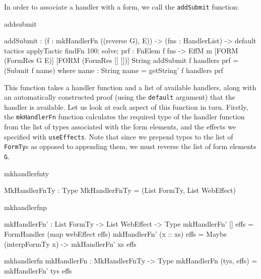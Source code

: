\noindent
In order to associate a handler with a form, we call the \texttt{addSubmit}
function:

\begin{SaveVerbatim}{addsubmit}

addSubmit : (f :  mkHandlerFn ((reverse G), E)) ->
            (fns : HandlerList) ->
            {default tactics 
              { applyTactic findFn 100; solve; }
              prf : FnElem f fns} ->
            EffM m [FORM (FormRes G E)]
                   [FORM (FormRes [] [])] 
                   String
addSubmit f handlers {prf} = (Submit f name)
    where name : String
          name = getString' f handlers prf          

\end{SaveVerbatim}

\noindent
This function takes a handler function and a list of available handlers, along with
an automatically constructed proof (using the \texttt{default} argument) that the
handler is available.
Let us look at each aspect of this function in turn. Firstly, the
\texttt{mkHandlerFn} function calculates the required type of the handler
function from the list of types associated with the form elements, and the
effects we specified with \texttt{useEffects}. Note that since we prepend types
to the list of \texttt{FormTy}s as opposed to appending them, we must reverse
the list of form elements \texttt{G}.

\begin{SaveVerbatim}{mkhandlerfnty}

MkHandlerFnTy : Type
MkHandlerFnTy = (List FormTy, List WebEffect)

\end{SaveVerbatim}

\begin{SaveVerbatim}{mkhandlerfnp}

mkHandlerFn' : List FormTy -> List WebEffect -> Type
mkHandlerFn' [] effs = FormHandler (map webEffect effs) 
mkHandlerFn' (x :: xs) effs = Maybe (interpFormTy x) -> 
                              mkHandlerFn' xs effs 
\end{SaveVerbatim}

\begin{SaveVerbatim}{mkhandlerfn}
mkHandlerFn : MkHandlerFnTy -> Type 
mkHandlerFn (tys, effs) = mkHandlerFn' tys effs 

\end{SaveVerbatim}


